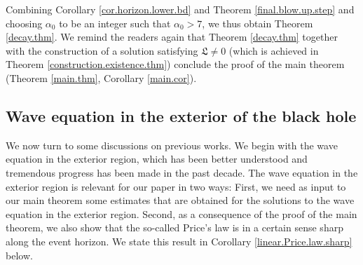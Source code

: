 \documentclass[12 pt, reqno]{amsart}
\theoremstyle{definition}
\theoremstyle{remark}
\numberwithin{equation}{section}
\newcommand{\0}{\emptyset}
\newcommand{\alp}{\alpha}
\begin{document}
Combining Corollary \ref{cor.horizon.lower.bd} and Theorem \ref{final.blow.up.step} and choosing $\alp_0$ to be an integer such that $\alp_0>7$, we thus obtain Theorem \ref{decay.thm}. We remind the readers again that Theorem \ref{decay.thm} together with the construction of a solution satisfying $\mathfrak L\neq 0$ (which is achieved in Theorem \ref{construction.existence.thm}) conclude the proof of the main theorem (Theorem \ref{main.thm}, Corollary \ref{main.cor}).

\subsection{Wave equation in the exterior of the black hole}\label{sec.exterior}

We now turn to some discussions on previous works. We begin with the wave equation in the exterior region, which has been better understood and tremendous progress has been made in the past decade. The wave equation in the exterior region is relevant for our paper in two ways: First, we need as input to our main theorem some estimates that are obtained for the solutions to the wave equation in the exterior region. Second, as a consequence of the proof of the main theorem, we also show that the so-called Price's law is in a certain sense sharp along the event horizon. We state this result in Corollary \ref{linear.Price.law.sharp} below.
\end{document}
